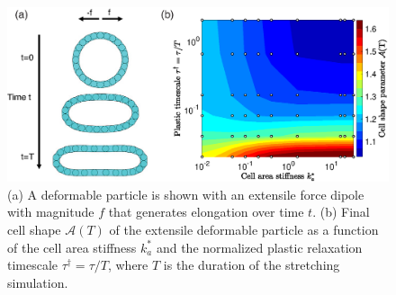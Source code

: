 \documentclass[%
 reprint,
superscriptaddress,
 amsmath,amssymb,
pre,
]{revtex4-2}
\begin{document}
\begin{figure}
    \centering
    \includegraphics[width=\linewidth]{suppFigures/SuppDipole.eps}
\caption{(a) A deformable particle is shown with an extensile force dipole with magnitude $f$ that generates elongation over time $t$. (b) Final cell shape $\mathcal{A}(T)$ of the extensile deformable particle as a function of the cell area stiffness $k_a^*$ and the normalized plastic relaxation timescale $\tau^\dag = \tau / T$, where $T$ is the duration of the stretching simulation. 
}
\label{suppfig:forceDipole}
\end{figure}

\clearpage

\end{document}
